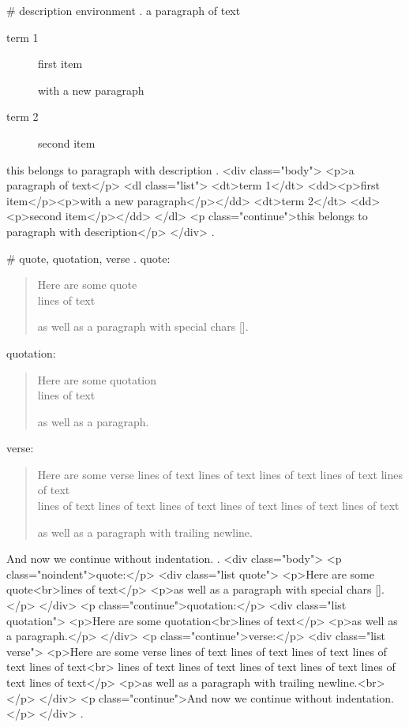 #
description environment
.
a paragraph of text

\begin{description}
    \item[term 1] first item

        with a new paragraph
    \item[term 2] second item
\end{description}
this belongs to paragraph with description
.
<div class="body">
<p>a paragraph of text</p>
<dl class="list">
<dt>term 1</dt>
<dd><p>ﬁrst item</p><p>with a new paragraph</p></dd>
<dt>term 2</dt>
<dd><p>second item</p></dd>
</dl>
<p class="continue">this belongs to paragraph with description</p>
</div>
.

#
quote, quotation, verse
.
\noindent quote:
\begin{quote}
    Here are some quote\\
    lines of text

    as well as a paragraph with special chars [].
\end{quote}
quotation:
\begin{quotation}
    Here are some quotation\\
    lines of text

    as well as a paragraph.
\end{quotation}
verse:
\begin{verse}
    Here are some verse lines of text lines of text lines of text lines of text lines of text \\
    lines of text lines of text lines of text lines of text lines of text lines of text

    as well as a paragraph with trailing newline.\\
\end{verse}
And now we continue without indentation.
.
<div class="body">
<p class="noindent">quote:</p>
<div class="list quote">
<p>Here are some quote<br>lines of text</p>
<p>as well as a paragraph with special chars [].</p>
</div>
<p class="continue">quotation:</p>
<div class="list quotation">
<p>Here are some quotation<br>lines of text</p>
<p>as well as a paragraph.</p>
</div>
<p class="continue">verse:</p>
<div class="list verse">
<p>Here are some verse lines of text lines of text lines of text lines of text lines of text<br>
lines of text lines of text lines of text lines of text lines of text lines of text</p>
<p>as well as a paragraph with trailing newline.<br></p>
</div>
<p class="continue">And now we continue without indentation.</p>
</div>
.



